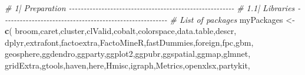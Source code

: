 \documentclass[
]{article}
\newenvironment{Shaded}{\begin{snugshade}}{\end{snugshade}}
\newcommand{\CommentTok}[1]{\textcolor[rgb]{0.56,0.35,0.01}{\textit{#1}}}
\newcommand{\FunctionTok}[1]{\textcolor[rgb]{0.13,0.29,0.53}{\textbf{#1}}}
\newcommand{\NormalTok}[1]{#1}
\newcommand{\OtherTok}[1]{\textcolor[rgb]{0.56,0.35,0.01}{#1}}
\newcommand{\StringTok}[1]{\textcolor[rgb]{0.31,0.60,0.02}{#1}}
\begin{document}
\begin{Shaded}
\begin{Highlighting}[]

\CommentTok{\# 1| Preparation {-}{-}{-}{-}{-}{-}{-}{-}{-}{-}{-}{-}{-}{-}{-}{-}{-}{-}{-}{-}{-}{-}{-}{-}{-}{-}{-}{-}{-}{-}{-}{-}{-}{-}{-}{-}{-}{-}{-}{-}{-}{-}{-}{-}{-}{-}{-}{-}{-}{-}{-}{-}{-}{-}{-}{-}}
\CommentTok{\# 1.1| Libraries {-}{-}{-}{-}{-}{-}{-}{-}{-}{-}{-}{-}{-}{-}{-}{-}{-}{-}{-}{-}{-}{-}{-}{-}{-}{-}{-}{-}{-}{-}{-}{-}{-}{-}{-}{-}{-}{-}{-}{-}{-}{-}{-}{-}{-}{-}{-}{-}{-}{-}{-}{-}{-}{-}{-}{-}}
\CommentTok{\# List of packages}
\NormalTok{myPackages }\OtherTok{\textless{}{-}} \FunctionTok{c}\NormalTok{(}
  \StringTok{\textquotesingle{}broom\textquotesingle{}}\NormalTok{,}\StringTok{\textquotesingle{}caret\textquotesingle{}}\NormalTok{,}\StringTok{\textquotesingle{}cluster\textquotesingle{}}\NormalTok{,}\StringTok{\textquotesingle{}clValid\textquotesingle{}}\NormalTok{,}\StringTok{\textquotesingle{}cobalt\textquotesingle{}}\NormalTok{,}\StringTok{\textquotesingle{}colorspace\textquotesingle{}}\NormalTok{,}\StringTok{\textquotesingle{}data.table\textquotesingle{}}\NormalTok{,}\StringTok{\textquotesingle{}descr\textquotesingle{}}\NormalTok{,}
  \StringTok{\textquotesingle{}dplyr\textquotesingle{}}\NormalTok{,}\StringTok{\textquotesingle{}extrafont\textquotesingle{}}\NormalTok{,}\StringTok{\textquotesingle{}factoextra\textquotesingle{}}\NormalTok{,}\StringTok{\textquotesingle{}FactoMineR\textquotesingle{}}\NormalTok{,}\StringTok{\textquotesingle{}fastDummies\textquotesingle{}}\NormalTok{,}\StringTok{\textquotesingle{}foreign\textquotesingle{}}\NormalTok{,}\StringTok{\textquotesingle{}fpc\textquotesingle{}}\NormalTok{,}\StringTok{\textquotesingle{}gbm\textquotesingle{}}\NormalTok{,}
  \StringTok{\textquotesingle{}geosphere\textquotesingle{}}\NormalTok{,}\StringTok{\textquotesingle{}ggdendro\textquotesingle{}}\NormalTok{,}\StringTok{\textquotesingle{}ggparty\textquotesingle{}}\NormalTok{,}\StringTok{\textquotesingle{}ggplot2\textquotesingle{}}\NormalTok{,}\StringTok{\textquotesingle{}ggpubr\textquotesingle{}}\NormalTok{,}\StringTok{\textquotesingle{}ggspatial\textquotesingle{}}\NormalTok{,}\StringTok{\textquotesingle{}ggmap\textquotesingle{}}\NormalTok{,}\StringTok{\textquotesingle{}glmnet\textquotesingle{}}\NormalTok{,}
  \StringTok{\textquotesingle{}gridExtra\textquotesingle{}}\NormalTok{,}\StringTok{\textquotesingle{}gtools\textquotesingle{}}\NormalTok{,}\StringTok{\textquotesingle{}haven\textquotesingle{}}\NormalTok{,}\StringTok{\textquotesingle{}here\textquotesingle{}}\NormalTok{,}\StringTok{\textquotesingle{}Hmisc\textquotesingle{}}\NormalTok{,}\StringTok{\textquotesingle{}igraph\textquotesingle{}}\NormalTok{,}\StringTok{\textquotesingle{}Metrics\textquotesingle{}}\NormalTok{,}\StringTok{\textquotesingle{}openxlsx\textquotesingle{}}\NormalTok{,}\StringTok{\textquotesingle{}partykit\textquotesingle{}}\NormalTok{,}

\end{Highlighting}
\end{Shaded}
\end{document}

